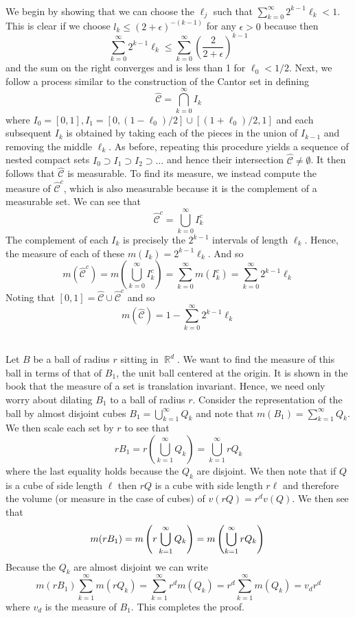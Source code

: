 \documentclass{article}
\DeclareMathOperator{\R}{\mathbb{R}}
\newcommand{\problem}[1]{\noindent{\textbf{Problem #1}}\\}
\newcommand{\problempart}[1]{\noindent{\textbf{(#1)}}}
\begin{document}
\problem{1.6.4}
\problempart{a} We begin by showing that we can choose the $\ell_j$ such that $\sum_{k=0}^\infty 2^{k-1}\ell_k < 1$. This is clear if we choose $l_k \leq (2+\epsilon)^{-(k-1)}$ for any $\epsilon > 0$ because then
\[
\sum_{k=0}^\infty 2^{k-1}\ell_k \leq \sum_{k=0}^\infty \left(\frac{2}{2+\epsilon}\right)^{k-1} 
\]
and the sum on the right converges and is less than 1 for $\ell_0 < 1/2$. Next, we follow a process similar to the construction of the Cantor set in defining
\[
\hat{\mathcal{C}} = \bigcap_{k=0}^\infty I_k
\]
where $I_0 = [0,1], I_1 = [0, (1-\ell_0)/2]\cup [(1+\ell_0)/2, 1]$ and each subsequent $I_k$ is obtained by taking each of the pieces in the union of $I_{k-1}$ and removing the middle $\ell_k$. As before, repeating this procedure yields a sequence of nested compact sets $I_0 \supset I_1 \supset I_2 \supset \dots$ and hence their intersection $\hat{\mathcal{C}} \neq \emptyset$. It then follows that $\hat{\mathcal{C}}$ is measurable. To find its measure, we instead compute the measure of $\hat{\mathcal{C}}^c$, which is also measurable because it is the complement of a measurable set. We can see that
\[
\hat{\mathcal{C}}^c = \bigcup_{k=0}^\infty I_k^c
\] 
The complement of each $I_k$ is precisely the $2^{k-1}$ intervals of length $\ell_k$. Hence, the measure of each of these $m(I_k) = 2^{k-1}\ell_k$. And so
\[
m(\hat{\mathcal{C}}^c) = m(\bigcup_{k=0}^\infty I_k^c) = \sum_{k=0}^\infty m(I_k^c) = \sum_{k=0}^\infty 2^{k-1}\ell_k
\]
Noting that $[0,1] = \hat{\mathcal{C}} \cup \hat{\mathcal{C}}^c$ and so 
\[
m(\hat{\mathcal{C}}) = 1 - \sum_{k=0}^\infty 2^{k-1}\ell_k
\]

\problem{1.6.6}
Let $B$ be a ball of radius $r$ sitting in $\R^d$. We want to find the measure of this ball in terms of that of $B_1$, the unit ball centered at the origin. It is shown in the book that the measure of a set is translation invariant. Hence, we need only worry about dilating $B_1$ to a ball of radius $r$. Consider the representation of the ball by almost disjoint cubes $B_1 = \bigcup_{k=1}^\infty Q_k$ and note that $m(B_1) = \sum_{k=1}^\infty Q_k$. We then scale each set by $r$ to see that 
\[
rB_1 = r\left(\bigcup_{k=1}^\infty Q_k\right) = \bigcup_{k=1}^\infty rQ_k
\]
where the last equality holds because the $Q_k$ are disjoint. We then note that if $Q$ is a cube of side length $\ell$ then $rQ$ is a cube with side length $r\ell$ and therefore the volume (or measure in the case of cubes) of $v(rQ) = r^dv(Q)$. We then see that
\[
m(rB_1) = m\left(r\bigcup_{k=1}^\infty Q_k\right) = m\left(\bigcup_{k=1}^\infty rQ_k\right) \\
\]
Because the $Q_k$ are almost disjoint we can write
\[
m(rB_1) \sum_{k=1}^\infty m(rQ_k) = \sum_{k=1}^\infty r^dm(Q_k) = r^d\sum_{k=1}^\infty m(Q_k) = v_dr^d 
\]
where $v_d$ is the measure of $B_1$. This completes the proof.
\end{document}
